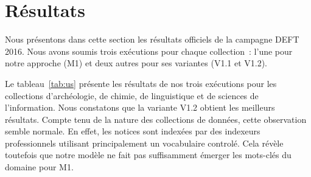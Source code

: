 \documentclass[10pt,twoside]{article}
\begin{document}
    \section{Résultats}
    \label{sec:res}
        Nous présentons dans cette section les résultats officiels de la campagne DEFT 2016.
        Nous avons soumis trois exécutions pour chaque collection~: l'une pour notre approche (M1) et deux autres pour ses variantes (V1.1 et V1.2).
        
        \begin{table}[htb!]
            \centering
            \caption{Résultats de nos trois exécutions pour les collections d'archéologie, de chimie, de linguistique et de sciences de l'information\label{tab:us}}
        \end{table}
        
        Le tableau~\ref{tab:us} présente les résultats de nos trois exécutions pour les collections d'archéologie, de chimie, de linguistique et de sciences de l'information.
        Nous constatons que la variante V1.2 obtient les meilleurs résultats.
        Compte tenu de la nature des collections de données, cette observation semble normale.
        En effet, les notices sont indexées par des indexeurs professionnels utilisant principalement un vocabulaire controlé.
        Cela révèle toutefois que notre modèle ne fait pas suffisamment émerger les mots-clés du domaine pour M1.
        
\end{document}
